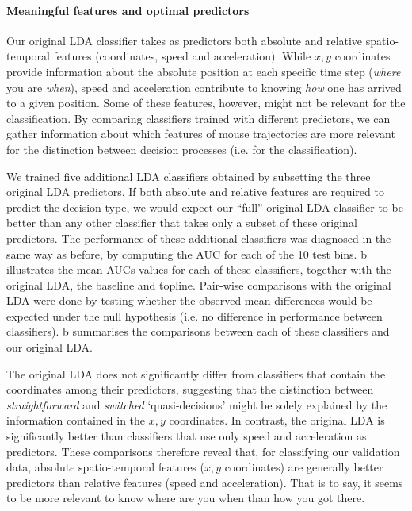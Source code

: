 \documentclass{article}
\begin{document}
\paragraph{Meaningful features and optimal predictors}
Our original LDA classifier takes as predictors both absolute and relative spatio-temporal features (coordinates, speed and acceleration). 
While $x,y$ coordinates provide information about the absolute  position at each specific time step (\emph{where} you are \emph{when}), speed and acceleration contribute to knowing \emph{how} one has arrived to a given position. 
Some of these features, however, might not be relevant for the classification. 
By comparing classifiers trained with different predictors, we can gather information about which features of mouse trajectories are more relevant for the distinction between decision processes (i.e. for the classification). 

We trained five additional LDA classifiers obtained by subsetting the three original LDA predictors. If both absolute and relative features are required to predict the decision type, we would expect our ``full'' original LDA classifier to be better than any other classifier that takes only a subset of these original predictors. 
The performance of these additional classifiers was diagnosed in the same way as before, by computing the AUC for each of the 10 test bins. b illustrates the mean AUCs values for each of these classifiers, together with the original LDA, the baseline and topline. 
Pair-wise comparisons with the original LDA were done by testing whether the observed mean differences would be expected under the null hypothesis (i.e. no difference in performance between classifiers). b summarises the comparisons between each of these classifiers and our original LDA. 	

The original LDA does not significantly differ from classifiers that contain the coordinates among their predictors, suggesting that the distinction between \emph{straightforward} and \emph{switched} `quasi-decisions' might be solely explained by the information contained in the $x,y$ coordinates. 
In contrast, the original LDA is significantly better than classifiers that use only speed and acceleration as predictors. These comparisons therefore reveal that, for classifying our validation data, absolute spatio-temporal features ($x,y$ coordinates) are generally better predictors than relative features (speed and acceleration). That is to say, it seems to be more relevant to know where are you when than how you got there. 
\end{document}
